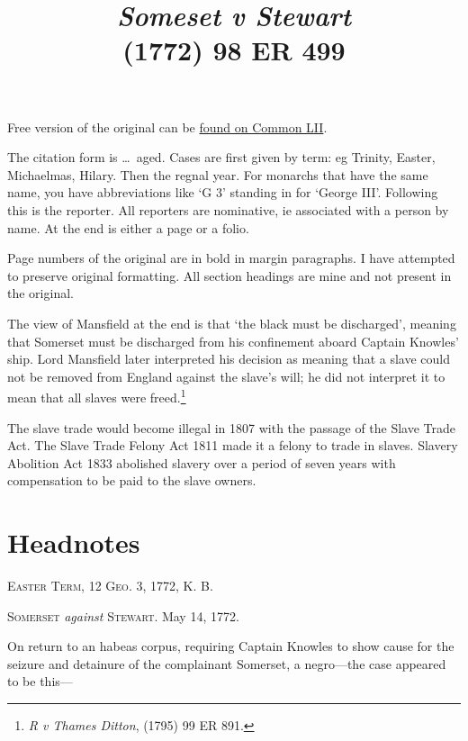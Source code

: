 \documentclass[a4paper]{article}
\title{\vspace{-6ex} \emph{Someset v Stewart} \\
{\large (1772) 98 ER 499}}
\author{\vspace{-6ex}}
\date{\vspace{-6ex}}
\begin{document}
\maketitle

Free version of the original can be  \href{http://www.commonlii.org/int/cases/EngR/1772/57.pdf}{found on Common LII}.

The citation form is \ldots\ aged. Cases are first given by term: eg Trinity, Easter, Michaelmas, Hilary. Then the regnal year. For monarchs that have the same name, you have abbreviations like `G 3' standing in for `George III'. Following this is the reporter. All reporters are nominative, ie associated with a person by name. At the end is either a page or a folio.

Page numbers of the original are in bold in margin paragraphs. I have attempted to preserve original formatting. All section headings are mine and not present in the original.

The view of Mansfield at the end is that `the black must be discharged', meaning that Somerset must be discharged from his confinement aboard Captain Knowles' ship. Lord Mansfield later interpreted his decision as meaning that a slave could not be removed from England against the slave's will; he did not interpret it to mean that all slaves were freed.\footnote{\emph{R v Thames Ditton}, (1795) 99 ER 891.}

The slave trade would become illegal in 1807 with the passage of the Slave Trade Act. The Slave Trade Felony Act 1811 made it a felony to trade in slaves. Slavery Abolition Act 1833 abolished slavery over a period of seven years with compensation to be paid to the slave owners.

\tableofcontents

\clearpage

\section{Headnotes}
\begin{center}
    \textsc{Easter Term, 12 Geo. 3, 1772, K. B.} 
    
    \textsc{Somerset} \emph{against} \textsc{Stewart}. May 14, 1772.
\end{center}

On return to an habeas corpus, requiring Captain Knowles to show cause for the seizure and detainure of the complainant Somerset, a negro---the case appeared to be this---
\end{document}
